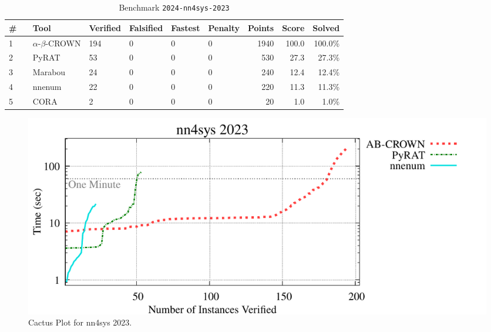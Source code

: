\clearpage

\begin{table}[h]
\begin{center}
\caption{Benchmark \texttt{2024-nn4sys-2023}} \label{tab:cat_{cat}}
{\setlength{\tabcolsep}{2pt}
\begin{tabular}[h]{@{}llllllrrr@{}}
\toprule
\textbf{\# ~} & \textbf{Tool} & \textbf{Verified} & \textbf{Falsified} & \textbf{Fastest} & \textbf{Penalty} & \textbf{Points} & \textbf{Score} & \textbf{Solved}\\
\midrule
1 & $\alpha$-$\beta$-CROWN & 194 & 0 & 0 & 0 & 1940 & 100.0 & 100.0\% \\
2 & PyRAT & 53 & 0 & 0 & 0 & 530 & 27.3 & 27.3\% \\
3 & Marabou & 24 & 0 & 0 & 0 & 240 & 12.4 & 12.4\% \\
4 & nnenum & 22 & 0 & 0 & 0 & 220 & 11.3 & 11.3\% \\
5 & CORA & 2 & 0 & 0 & 0 & 20 & 1.0 & 1.0\% \\
\bottomrule
\end{tabular}
}
\end{center}
\end{table}



\begin{figure}[h]
\centerline{\includegraphics[width=\textwidth]{cactus/2024_nn4sys_2023.pdf}}
\caption{Cactus Plot for nn4sys 2023.}
\label{fig:quantPic}
\end{figure}


\clearpage

